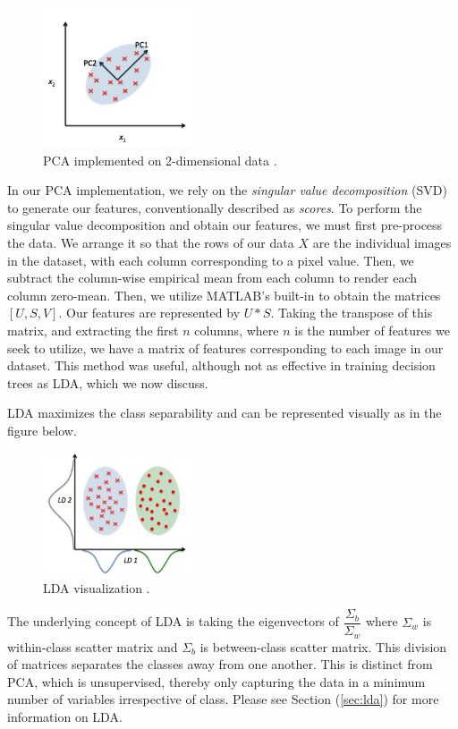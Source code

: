 	\begin{figure}[H]
		\centering\includegraphics[width=0.4\textwidth]{../images/pca}
		\caption{PCA implemented on 2-dimensional data \cite{images:ldapca}. }
	\end{figure}

        In our PCA implementation, we rely on the \emph{singular value decomposition} (SVD) to generate our features, conventionally described as \emph{scores}. To perform the singular value decomposition and obtain our features, we must first pre-process the data. We arrange it so that the rows of our data $X$ are the individual images in the dataset, with each column corresponding to a pixel value. Then, we subtract the column-wise empirical mean from each column to render each column zero-mean. Then, we utilize MATLAB's built-in  to obtain the matrices $[U, S, V]$. Our features are represented by $U*S$. Taking the transpose of this matrix, and extracting the first $n$ columns, where $n$ is the number of features we seek to utilize, we have a matrix of features corresponding to each image in our dataset. This method was useful, although not as effective in training decision trees as LDA, which we now discuss.

LDA maximizes the class separability and can be represented visually as in the figure below. 
	\begin{figure}[H]
	\centering\includegraphics[width=0.4\textwidth]{../images/lda}
	\caption{LDA visualization \cite{images:ldapca}.}
	\end{figure}
        The underlying concept of LDA is taking the eigenvectors of $ \dfrac{\Sigma_b}{\Sigma_w}$ where $\Sigma_w$ is within-class scatter matrix and $\Sigma_b$ is between-class scatter matrix. This division of matrices separates the classes away from one another. This is distinct from PCA, which is unsupervised, thereby only capturing the data in a minimum number of variables irrespective of class. Please see Section (\ref{sec:lda}) for more information on LDA.
